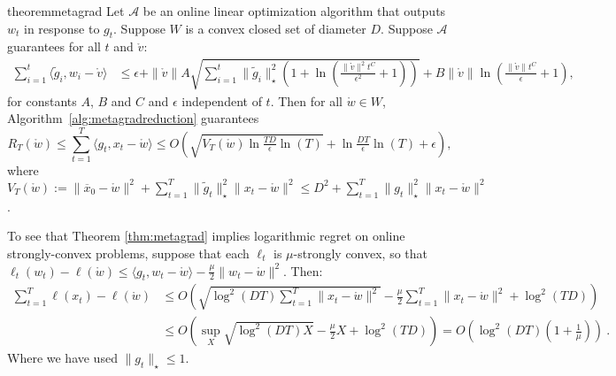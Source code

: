 \documentclass[12pt]{colt2018} %
\newcommand{\ol}{\mathcal{A}}
\newcommand{\w}{\mathring{w}}
\renewcommand{\v}{\mathring{v}}
\begin{document}
\begin{restatable}{theorem}{metagrad}\label{thm:metagrad}
Let $\ol$ be an online linear optimization algorithm that outputs $w_t$ in response to $g_t$.
Suppose $W$ is a convex closed set of diameter $D$. Suppose $\ol$ guarantees for all $t$ and $\v$:
\begin{align*}
\sum_{i=1}^t \langle \tilde{g}_i,w_i-\v\rangle &\le \epsilon + \|\v\|A\sqrt{\sum_{i=1}^t \|\tilde{g}_i\|_\star^2\left(1+\ln\left(\tfrac{\|\v\|^2t^C}{\epsilon^2}+1\right)\right)} + B\|\v\|\ln\left(\tfrac{\|\v\|t^C}{\epsilon}+1\right),
\end{align*}
for constants $A$, $B$ and $C$ and $\epsilon$ independent of $t$.
Then for all $\w \in W$, Algorithm~\ref{alg:metagradreduction} guarantees
\[
R_T(\w) \le \sum_{t=1}^T\langle g_t,x_t-\w\rangle
\le O\left(\sqrt{V_T(\w)\ln\tfrac{T D}{\epsilon}\ln(T)} + \ln\tfrac{DT}{\epsilon}\ln(T)+\epsilon\right),
\]
where $V_T(\w) := \|\overline{x}_0-\w\|^2+\sum_{t=1}^T\|\tilde{g}_t\|_\star ^2\|x_t-\w\|^2\le D^2+\sum_{t=1}^T\|g_t\|_\star ^2\|x_t-\w\|^2$.
\end{restatable}
%
To see that Theorem \ref{thm:metagrad} implies logarithmic regret on online strongly-convex problems, suppose that each $\ell_t$ is $\mu$-strongly convex, so that $\ell_t(w_t)-\ell(\w)\le \langle g_t, w_t-\w\rangle - \tfrac{\mu}{2}\|w_t-\w\|^2$. Then:
\begin{align*}
\sum_{t=1}^T \ell(x_t)-\ell(\w)&\le O\left(\sqrt{\log^2(DT)\sum_{t=1}^T \|x_t-\w\|^2} -\frac{\mu}{2}\sum_{t=1}^T\|x_t-\w\|^2+ \log^2(TD)\right)\\
&\le O\left(\sup_{X}\sqrt{\log^2(DT)X} -\frac{\mu}{2}X+ \log^2(TD)\right)=O\left(\log^2(DT)\left(1+\frac{1}{\mu}\right)\right)~.
\end{align*}
Where we have used $\|g_t\|_\star\le 1$.
\end{document}
